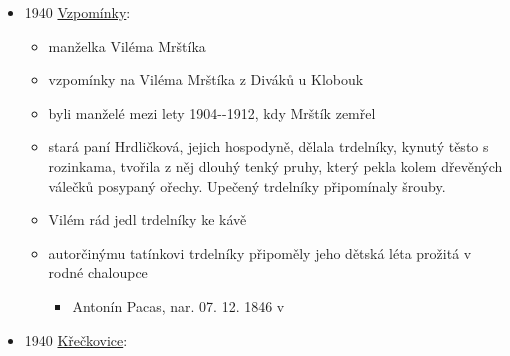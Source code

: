 \begin{itemize}
  \begin{itemize}
  \tightlist
  \item
    Hvězda československých paní a dívek. 24.02.1939. Praha: Melantrich,
    roč. 14, č. 8, s. 9.
  \item
    povídka \emph{Hřích svatého Matěje}
  \item
    kluk s dívkou Márinkou jsou na rande na matějský pouti, ten je
    rozmrzelej, že je všechno drahý a nechce se mu nic kupovat. A
    vlastně ho Márinka celkem štve.
  \item
    v tlačenici se navzájem ztratí a kluk natrefí na jinou holku, která
    se mu vlastně líbí víc, než Márinka
  \item
    u jednoho stánku chlapík pořvává \emph{český trdlovec, tady je ta
    největší pochoutka}. Tak ho za dvě koruny koupil. A ona pak chtěla,
    aby jí kupoval další sladkosti, bral jí na atrakce a večer na
    tancovačku. Nakonec před ní uteče do jinýho davu a je šťastnej, když
    najde nudnou Márinku.
  \end{itemize}
\item
  1940
  \href{https://ndk.cz/view/uuid:911977c0-052e-11e8-816d-5ef3fc9bb22f?page=uuid\%3Aa0797b50-0cb5-11e8-8ee4-005056825209}{Vzpomínky}:

  \begin{itemize}
  \tightlist
  \item
     manželka Viléma Mrštíka
  \item
    vzpomínky na Viléma Mrštíka z Diváků u Klobouk
  \item
    byli manželé mezi lety 1904-\/-1912, kdy Mrštík zemřel
  \item
    stará paní Hrdličková, jejich hospodyně, dělala trdelníky, kynutý
    těsto s rozinkama, tvořila z něj dlouhý tenký pruhy, který pekla
    kolem dřevěných válečků posypaný ořechy. Upečený trdelníky
    připomínaly šrouby.
  \item
    Vilém rád jedl trdelníky ke kávě
  \item
    autorčinýmu tatínkovi trdelníky připoměly jeho dětská léta prožitá v
    rodné chaloupce

    \begin{itemize}
    \tightlist
    \item
      Antonín Pacas, nar. 07. 12. 1846 v 
    \end{itemize}
  \end{itemize}
\item
  1940
  \href{https://ceskadigitalniknihovna.cz/view/uuid:d065e200-90ad-11e8-87bd-005056827e52?page=uuid:47609990-a79c-11e8-ba56-5ef3fc9bb22f&fulltext=trdeln\%C3\%ADky&source=nkp}{Křečkovice}:


\end{itemize}
